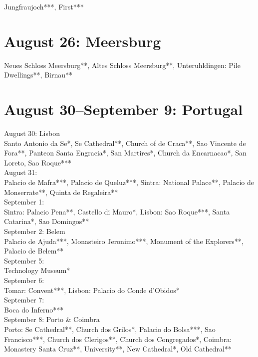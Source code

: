 Jungfraujoch***, First***

\section{August 26: Meersburg}
\label{Meersburg2018}

Neues Schloss Meersburg**, Altes Schloss Meersburg**, Unteruhldingen: Pile Dwellings**, Birnau**

\section{August 30--September 9: Portugal}
\label{Portugal2012}

August 30: Lisbon\\
Santo Antonio da Se*, Se Cathedral**, Church of de Craca**, Sao Vincente de Fora**,  Panteon Santa Engracia*, San Martires*, Church da Encarnacao*, San Loreto, Sao Roque***\\

August 31:\\
Palacio de Mafra***, Palacio de Queluz***, Sintra: National Palace**, Palacio de Monserrate**, Quinta de Regaleira**\\

September 1:\\
Sintra: Palacio Pena**, Castello di Mauro*, Lisbon: Sao Roque***, Santa Catarina*, Sao Domingos**\\

September 2: Belem\\
Palacio de Ajuda***, Monasteiro Jeronimo***, Monument of the Explorers**, Palacio de Belem**\\

September 5:\\
Technology Museum*\\

September 6:\\
Tomar: Convent***, Lisbon: Palacio do Conde d'Obidos*\\

September 7:\\
Boca do Inferno***\\

September 8: Porto \& Coimbra\\
Porto: Se Cathedral**, Church dos Grilos*, Palacio do Bolsa***, Sao Francisco***, Church dos Clerigos**, Church dos Congregados*, Coimbra: Monastery Santa Cruz**, University**, New Cathedral*, Old Cathedral**\\

